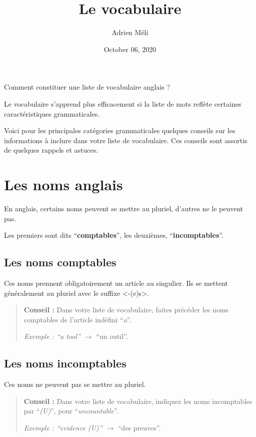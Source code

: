 \documentclass[
  10pt,
]{article}
\title{Le vocabulaire}
\author{Adrien Méli}
\date{October 06, 2020}
\begin{document}
\maketitle

{
\setcounter{tocdepth}{1}
\tableofcontents
}
Comment constituer une liste de vocabulaire anglais ?

Le vocabulaire s'apprend plus efficacement si la liste de mots reflète certaines caractéristiques grammaticales.

Voici pour les principales catégories grammaticales quelques conseils sur les informations à inclure dans votre liste de vocabulaire.
Ces conseils sont assortis de quelques rappels et astuces.

\hypertarget{les-noms-anglais}{%
\section{Les noms anglais}\label{les-noms-anglais}}

En anglais, certains noms peuvent se mettre au pluriel, d'autres ne le peuvent pas.

Les premiers sont dits ``\textbf{comptables}'', les deuxièmes, ``\textbf{incomptables}''.

\hypertarget{les-noms-comptables}{%
\subsection{Les noms comptables}\label{les-noms-comptables}}

Ces noms prennent obligatoirement un article au singulier.
Ils se mettent généralement au pluriel avec le suffixe \textless-(e)s\textgreater.

\begin{quote}
\textbf{Conseil :} Dans votre liste de vocabulaire, faites précéder les noms comptables de l'article indéfini ``\emph{a}''.

\emph{Exemple : ``a tool'' \(\rightarrow\)} ``un outil''.
\end{quote}

\hypertarget{les-noms-incomptables}{%
\subsection{Les noms incomptables}\label{les-noms-incomptables}}

Ces noms ne peuvent pas se mettre au pluriel.

\begin{quote}
\textbf{Conseil :} Dans votre liste de vocabulaire, indiquez les noms incomptables par ``\emph{(U)}'', pour ``\emph{uncountable}''.

\emph{Exemple : ``evidence (U)'' \(\rightarrow\)} ``des preuves''.
\end{quote}
\end{document}
